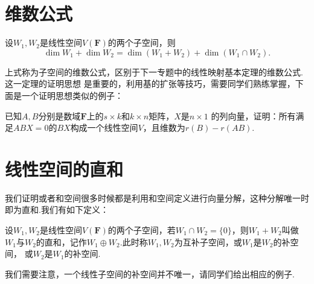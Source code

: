 \section{维数公式}
\begin{theorem}
	设$W_1,W_2$是线性空间$V(\mathbf{F})$的两个子空间，则
	$$\dim W_1+\dim W_2=\dim(W_1+W_2)+\dim(W_1\cap W_2).$$
\end{theorem}
上式称为子空间的维数公式，区别于下一专题中的线性映射基本定理的维数公式.这一定理的证明思想
是重要的，利用基的扩张等技巧，需要同学们熟练掌握，下面是一个证明思想类似的例子：
\begin{example}
	已知$A,B$分别是数域$\mathbf{F}$上的$s \times k$和$k \times n$矩阵，$X$是$n \times 1$
	的列向量，证明：所有满足$ABX=0$的$BX$构成一个线性空间$V$，且维数为$r(B)-r(AB).$
\end{example}

\section{线性空间的直和}
我们证明或者和空间很多时候都是利用和空间定义进行向量分解，这种分解唯一时即为直和.我们有如下定义：
\begin{definition}
	设$W_1,W_2$是线性空间$V(\mathbf{F})$的两个子空间，若$W_1 \cap W_2=\{0\}$，则$W_1+W_2$叫做
	$W_1$与$W_2$的直和，记作$W_1\oplus W_2$.此时称$W_1,W_2$为互补子空间，或$W_1$是$W_2$的补空间，
	或$W_2$是$W_1$的补空间.
\end{definition}
我们需要注意，一个线性子空间的补空间并不唯一，请同学们给出相应的例子.

